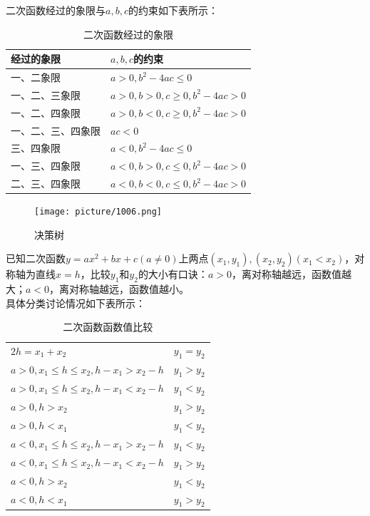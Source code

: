 \documentclass{ecnuthesis}
\begin{document}
\begin{knowledge}
    二次函数经过的象限与$a,b,c$的约束如下表所示：
\end{knowledge}
\begin{table}[H]
\centering
\caption{二次函数经过的象限}
\begin{tabular}{l|l}
\hline
\hline
经过的象限 & $a,b,c$的约束 \\
\hline
一、二象限 & $a>0,b^2-4ac \le 0$ \\
一、二、三象限 & $a>0,b>0,c\ge 0,b^2-4ac>0$ \\
一、二、四象限 & $a>0,b<0,c\ge 0,b^2-4ac>0$ \\
一、二、三、四象限 & $ac<0$ \\
三、四象限 & $a<0,b^2-4ac \le 0$ \\
一、三、四象限 & $a<0,b>0,c \le 0,b^2-4ac>0$ \\
二、三、四象限 & $a<0,b<0,c \le 0,b^2-4ac>0$ \\
\hline
\hline
\end{tabular}
\end{table}
\begin{figure}[H]
\centering
\texttt{[image: picture/1006.png]}
\caption{决策树}
\end{figure}
\begin{knowledge}
    已知二次函数$y=ax^2+bx+c(a\ne 0)$上两点$(x_1,y_1),(x_2,y_2)(x_1 < x_2)$，对称轴为直线$x=h$，比较$y_1$和$y_2$的大小有口诀：$a>0$，离对称轴越远，函数值越大；$a<0$，离对称轴越远，函数值越小。\\
    具体分类讨论情况如下表所示：
\end{knowledge}
\begin{table}[H]
\centering
\caption{二次函数函数值比较}
\begin{tabular}{l|l}
\hline
\hline
$2h=x_1+x_2$ & $y_1=y_2$ \\
$a>0, x_1 \le h \le x_2, h-x_1>x_2-h$ & $y_1>y_2$ \\
$a>0, x_1 \le h \le x_2, h-x_1<x_2-h$ & $y_1<y_2$ \\
$a>0, h > x_2$ & $y_1>y_2$ \\
$a>0, h < x_1$ & $y_1<y_2$ \\
$a<0, x_1 \le h \le x_2, h-x_1>x_2-h$ & $y_1<y_2$ \\
$a<0, x_1 \le h \le x_2, h-x_1<x_2-h$ & $y_1>y_2$ \\
$a<0, h > x_2$ & $y_1<y_2$ \\
$a<0, h < x_1$ & $y_1>y_2$ \\
\hline
\hline
\end{tabular}
\end{table}
\clearpage
\end{document}
